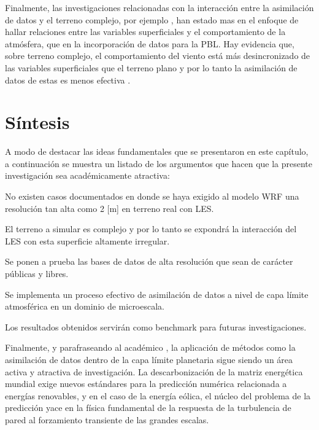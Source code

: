 Finalmente, las investigaciones relacionadas con la interacción entre la asimilación de datos y el terreno complejo, por ejemplo  \cite{hacker2018challenges}, han estado mas en el enfoque de hallar relaciones entre las variables superficiales y el comportamiento de la atmósfera, que en la incorporación de datos para la PBL. Hay evidencia que, sobre terreno complejo, el comportamiento del viento está más desincronizado de las variables superficiales que el terreno plano y por lo tanto la asimilación de datos de estas es menos efectiva \cite{hacker2018challenges}.
\newpage
\section{Síntesis}
A modo de destacar las ideas fundamentales que se presentaron en este capítulo, a continuación se muestra un listado de los argumentos que hacen que la presente investigación sea académicamente atractiva:
\begin{enumerate*}
	\item No existen casos documentados en donde se haya exigido al modelo WRF una resolución tan alta como 2 [m] en terreno real con LES.
	\item El terreno a simular es complejo y por lo tanto se expondrá la interacción del LES con esta superficie altamente irregular.
	\item Se ponen a prueba las bases de datos de alta resolución que sean de carácter públicas y libres.
	\item Se implementa un proceso efectivo de asimilación de datos a nivel de capa límite atmosférica en un dominio de microescala.
	\item Los resultados obtenidos servirán como benchmark para futuras investigaciones.
\end{enumerate*}

Finalmente, y parafraseando al académico \cite{doi:10.1080/14685248.2019.1584664}, la aplicación de métodos como la asimilación de datos dentro de la capa límite planetaria sigue siendo un área activa y atractiva de investigación. La descarbonización de la matriz energética mundial exige nuevos estándares para la predicción numérica relacionada a energías renovables, y en el caso de la energía eólica, el núcleo del problema de la predicción yace en la física fundamental de la respuesta de la turbulencia de pared al forzamiento transiente de las grandes escalas.

